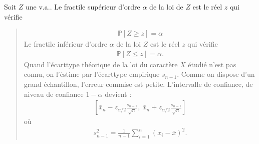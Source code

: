 \documentclass[letterpaper,11pt,english]{sphinxmanual}
\begin{document}
\begin{DUlineblock}{0em}
\item[] 
\item[] Soit \(Z\) une v.a.. Le fractile supérieur d’ordre \(\alpha\)
de la loi de \(Z\) est le réel \(z\) qui vérifie
\end{DUlineblock}
\begin{quote}
\begin{equation}\label{equation:chapter2:chapter2:58}
\begin{split}\mathbb{P}\left[Z\geq z\right] = \alpha\end{split}
\end{equation}
\sphinxAtStartPar
Le fractile inférieur d’ordre \(\alpha\) de la loi \(Z\) est
le réel \(z\) qui vérifie
\begin{equation}\label{equation:chapter2:chapter2:59}
\begin{split}\mathbb{P}\left[Z\leq z\right] = \alpha.\end{split}
\end{equation}
\sphinxAtStartPar
Quand l’écart\sphinxhyphen{}type théorique de la loi du caractère \(X\) étudié
n’est pas connu, on l’éstime par l’écart\sphinxhyphen{}type empirique
\(s_{n-1}\). Comme on dispose d’un grand échantillon, l’erreur
commise est petite. L’intervalle de confiance, de niveau de confiance
\(1-\alpha\) devient :
\begin{equation}\label{equation:chapter2:chapter2:60}
\begin{split}\left[\bar{x}_{n}-z_{\alpha / 2} \frac{s_{n-1}}{\sqrt{n}}, \ \bar{x}_{n}+z_{\alpha / 2} \frac{s_{n-1}}{\sqrt{n}}\right]\end{split}
\end{equation}
\sphinxAtStartPar
où
\begin{equation}\label{equation:chapter2:chapter2:61}
\begin{split}s_{n-1}^{2}=\frac{1}{n-1} \sum_{i=1}^{n}\left(x_{i}-\bar{x}\right)^{2}.\end{split}
\end{equation}\end{quote}
\end{document}
